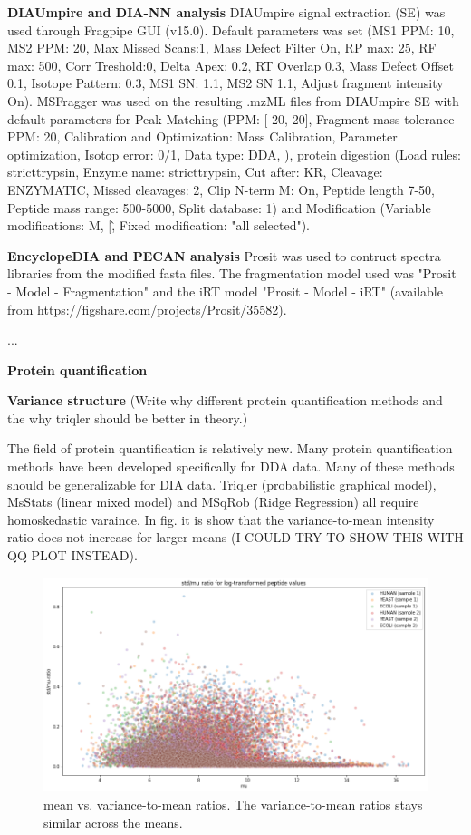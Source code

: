 \documentclass[10pt,letterpaper]{article}
\begin{document}
\textbf{DIAUmpire and DIA-NN analysis}
DIAUmpire signal extraction (SE) was used through Fragpipe GUI (v15.0). Default parameters was set (MS1 PPM: 10, MS2 PPM: 20, Max Missed Scans:1, Mass Defect Filter On, RP max: 25, RF max: 500, Corr Treshold:0, Delta Apex: 0.2, RT Overlap 0.3, Mass Defect Offset 0.1, Isotope Pattern: 0.3, MS1 SN: 1.1, MS2 SN 1.1, Adjust fragment intensity On). MSFragger was used on the resulting .mzML files from DIAUmpire SE with default parameters for Peak Matching (PPM: [-20, 20], Fragment mass tolerance PPM: 20, Calibration and Optimization: Mass Calibration, Parameter optimization, Isotop error: 0/1, Data type: DDA, ), protein digestion (Load rules: stricttrypsin, Enzyme name: stricttrypsin, Cut after: KR, Cleavage: ENZYMATIC, Missed cleavages: 2, Clip N-term M: On, Peptide length 7-50, Peptide mass range: 500-5000, Split database: 1) and Modification (Variable modifications: M, \/[\^, Fixed modification: "all selected"). 

\textbf{EncyclopeDIA and PECAN analysis}
Prosit was used to contruct spectra libraries from the modified fasta files. The fragmentation model used was "Prosit - Model - Fragmentation" and the iRT model "Prosit - Model - iRT" (available from https://figshare.com/projects/Prosit/35582).

...


\textbf{Protein quantification}

\textbf{Variance structure}
(Write why different protein quantification methods and the why triqler should be better in theory.) 

The field of protein quantification is relatively new. Many protein quantification methods have been developed specifically for DDA data. Many of these methods should be generalizable for DIA data. Triqler (probabilistic graphical model), MsStats (linear mixed model) and MSqRob (Ridge Regression) all require homoskedastic varaince. In fig. it is show that the variance-to-mean intensity ratio does not increase for larger means (I COULD TRY TO SHOW THIS WITH QQ PLOT INSTEAD). 

\begin{figure}[htp]
    \centering
    \includegraphics[width=12cm]{../../result/2021-08-13_docs_plots/variance_to_mean_plot.png}
    \caption{mean vs. variance-to-mean ratios. The variance-to-mean ratios stays similar across the means.}
    \label{fig:variance_to_mean_ratio}
\end{figure}
\end{document}
